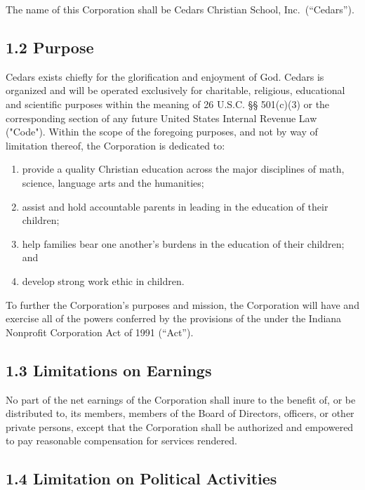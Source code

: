 \documentclass[
]{book}
\begin{document}
The name of this Corporation shall be Cedars Christian School, Inc.~(``Cedars'').

\subsection*{1.2 Purpose}\label{purpose}

Cedars exists chiefly for the glorification and enjoyment of God. Cedars is organized and will be operated exclusively for charitable, religious, educational and scientific purposes within the meaning of 26 U.S.C. §§ 501(c)(3) or the corresponding section of any future United States Internal Revenue Law ("Code"). Within the scope of the foregoing purposes, and not by way of limitation thereof, the Corporation is dedicated to:

\begin{enumerate}
\def\labelenumi{\alph{enumi}.}
\item
  provide a quality Christian education across the major disciplines of math, science, language arts and the humanities;
\item
  assist and hold accountable parents in leading in the education of their children;
\item
  help families bear one another's burdens in the education of their children; and
\item
  develop strong work ethic in children.
\end{enumerate}

To further the Corporation's purposes and mission, the Corporation will have and exercise all of the powers conferred by the provisions of the under the Indiana Nonprofit Corporation Act of 1991 (``Act'').

\subsection*{1.3 Limitations on Earnings}\label{limitations-on-earnings}

No part of the net earnings of the Corporation shall inure to the benefit of, or be distributed to, its members, members of the Board of Directors, officers, or other private persons, except that the Corporation shall be authorized and empowered to pay reasonable compensation for services rendered.

\subsection*{1.4 Limitation on Political Activities}\label{limitation-on-political-activities}
\end{document}
